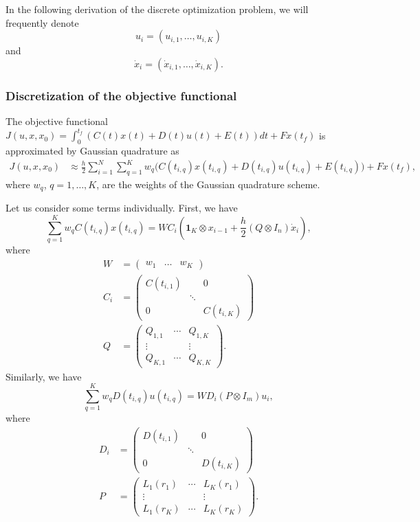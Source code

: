 \documentclass[a4paper,11pt,DIV12]{scrartcl}
\theoremstyle{remark}
\renewcommand{\matrix}[1]{\begin{pmatrix}#1\end{pmatrix}}
\begin{document}
In the following derivation of the discrete optimization problem, we will frequently denote
\begin{equation}
  u_i = (u_{i,1}, \dotsc, u_{i,K})
\end{equation}
and
\begin{equation}
  \dot x_i = (\dot x_{i,1}, \dotsc, \dot x_{i,K}).
\end{equation}

\subsubsection{Discretization of the objective functional}
\label{sec:discr-object-funct}

The objective functional $J(u,x,x_0) = \int_{0}^{t_f} (C(t) x(t) + D(t) u(t) + E(t)) dt + F x(t_f)$ is approximated by Gaussian quadrature as
\begin{equation}
  \label{eq:objective-gaussian-quadrature}
  \begin{aligned}
    J(u,x,x_0) &\approx \frac{h}{2} \sum_{i=1}^{N} \sum_{q=1}^{K} w_q \bigl(C(t_{i,q}) x(t_{i,q}) + D(t_{i,q}) u(t_{i,q}) + E(t_{i,q})\bigr) + F x(t_f),
  \end{aligned}
\end{equation}
where $w_q$, $q=1,\dotsc,K$, are the weights of the Gaussian quadrature scheme.

Let us consider some terms individually.
First, we have
\begin{equation}
  \label{eq:objective-state}
  \sum_{q=1}^{K} w_q C(t_{i,q}) x(t_{i,q}) =  W C_i (\textbf{1}_K \otimes x_{i-1} + \frac{h}{2} (Q \otimes I_n) \dot x_i),
\end{equation}
where
\begin{equation}
  \begin{aligned}
    W &= \matrix{w_1 & \dotsc & w_K} \\
    C_i &= \matrix{C(t_{i,1}) & & 0 \\ & \ddots & \\ 0 & & C(t_{i,K})} \\
    Q &= \matrix{Q_{1,1} & \cdots & Q_{1,K} \\ \vdots & & \vdots \\ Q_{K,1} & \cdots & Q_{K,K}}.
  \end{aligned}
\end{equation}
Similarly, we have
\begin{equation}
  \label{eq:objective-control}
  \sum_{q=1}^{K} w_q D(t_{i,q}) u(t_{i,q}) =  W D_i (P \otimes I_m) u_i,
\end{equation}
where
\begin{equation}
  \begin{aligned}
    D_i &= \matrix{D(t_{i,1}) & & 0 \\ & \ddots & \\ 0 & & D(t_{i,K})} \\
    P &= \matrix{L_1(r_1) & \cdots & L_K(r_1) \\ \vdots & & \vdots \\ L_1(r_K) & \cdots & L_K(r_K)}.
  \end{aligned}
\end{equation}
\end{document}
